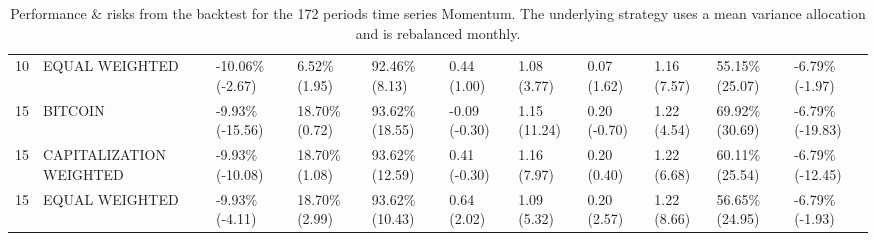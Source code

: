 \documentclass{article}
\begin{document}
\begin{landscape}
\begin{table}[H]
\begin{tabular}{p{0.4cm}|p{3cm}|p{1.65cm}|p{1.65cm}|p{1.65cm}|p{1.65cm}|p{1.65cm}|p{1.65cm}|p{1.65cm}|p{1.65cm}|p{1.65cm}}
\\ 
10&EQUAL WEIGHTED&-10.06\% (-2.67)&6.52\% (1.95)&92.46\% (8.13)&0.44 (1.00)&1.08 (3.77)&0.07 (1.62)&1.16 (7.57)&55.15\% (25.07)&-6.79\% (-1.97)
\\ 
15&BITCOIN&-9.93\% (-15.56)&18.70\% (0.72)&93.62\% (18.55)&-0.09 (-0.30)&1.15 (11.24)&0.20 (-0.70)&1.22 (4.54)&69.92\% (30.69)&-6.79\% (-19.83)
\\ 
15&CAPITALIZATION WEIGHTED&-9.93\% (-10.08)&18.70\% (1.08)&93.62\% (12.59)&0.41 (-0.30)&1.16 (7.97)&0.20 (0.40)&1.22 (6.68)&60.11\% (25.54)&-6.79\% (-12.45)
\\ 
15&EQUAL WEIGHTED&-9.93\% (-4.11)&18.70\% (2.99)&93.62\% (10.43)&0.64 (2.02)&1.09 (5.32)&0.20 (2.57)&1.22 (8.66)&56.65\% (24.95)&-6.79\% (-1.93)
\\ 
\bottomrule
  \end{tabular}
  \label{tab:tsmom172meanvar}
   \caption{Performance \& risks from the backtest for the 172 periods time series Momentum. The underlying strategy uses a mean variance allocation and is rebalanced monthly.}
\end{table}
\end{landscape}
\end{document}
